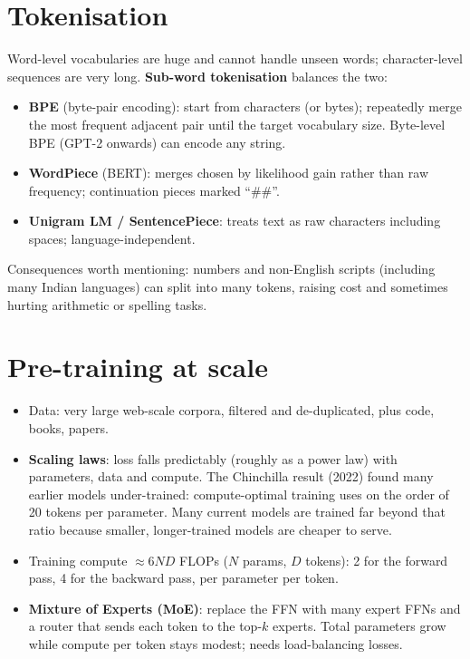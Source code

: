 \section{Tokenisation}
Word-level vocabularies are huge and cannot handle unseen words; character-level sequences are very long. \textbf{Sub-word tokenisation} balances the two:
\begin{itemize}
  \item \textbf{BPE} (byte-pair encoding): start from characters (or bytes); repeatedly merge the most frequent adjacent pair until the target vocabulary size. Byte-level BPE (GPT-2 onwards) can encode any string.
  \item \textbf{WordPiece} (BERT): merges chosen by likelihood gain rather than raw frequency; continuation pieces marked ``\#\#''.
  \item \textbf{Unigram LM / SentencePiece}: treats text as raw characters including spaces; language-independent.
\end{itemize}
Consequences worth mentioning: numbers and non-English scripts (including many Indian languages) can split into many tokens, raising cost and sometimes hurting arithmetic or spelling tasks.

\section{Pre-training at scale}
\begin{itemize}
  \item Data: very large web-scale corpora, filtered and de-duplicated, plus code, books, papers.
  \item \textbf{Scaling laws}: loss falls predictably (roughly as a power law) with parameters, data and compute. The Chinchilla result (2022) found many earlier models under-trained: compute-optimal training uses on the order of 20 tokens per parameter. Many current models are trained far beyond that ratio because smaller, longer-trained models are cheaper to serve.
  \item Training compute $\approx6ND$ FLOPs ($N$ params, $D$ tokens): 2 for the forward pass, 4 for the backward pass, per parameter per token.
  \item \textbf{Mixture of Experts (MoE)}: replace the FFN with many expert FFNs and a router that sends each token to the top-$k$ experts. Total parameters grow while compute per token stays modest; needs load-balancing losses.
\end{itemize}

